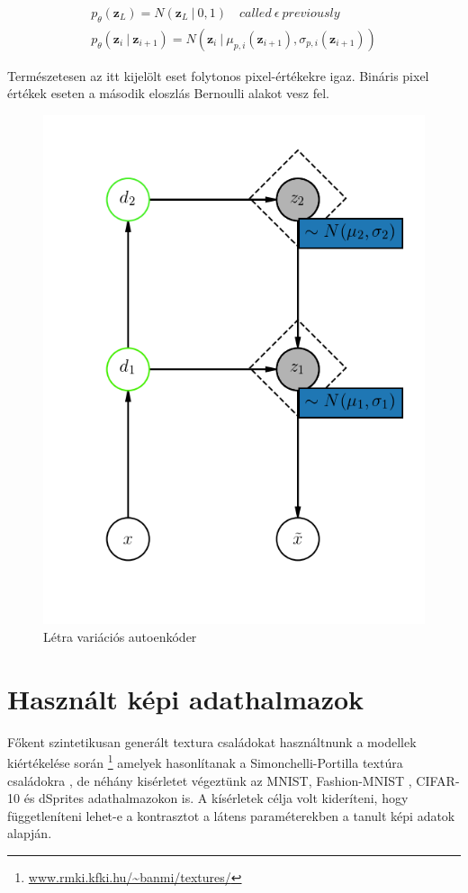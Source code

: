 \documentclass[12pt, english]{article}
\begin{document}
\vspace{4mm}

\begin{gather*}
    p_{\theta}(\bm{z}_L) = N(\bm{z}_L  ~ | ~ 0, 1) \quad called\ \epsilon\ previously\\
    p_{\theta}(\bm{z}_i ~ | ~ \bm{z}_{i+1}) = N(\bm{z}_i ~ |  ~ \mu_{p,i}(\bm{z}_{i+1}), \sigma_{p, i}(\bm{z}_{i+1}))
\end{gather*}

\vspace{4mm}

\par Természetesen az itt kijelölt eset folytonos pixel-értékekre igaz. Bináris pixel értékek eseten a második eloszlás Bernoulli alakot vesz fel.

\vspace{4mm}

\begin{figure}[H]
    \centering
    \includegraphics[width=0.35\linewidth]{lvae.png}
    \caption{Létra variációs autoenkóder}
\end{figure}

\newpage

\section{Használt képi adathalmazok}

\vspace{7mm}

\par Főkent szintetikusan generált textura családokat használtnunk a modellek kiértékelése során \footnote{\url{www.rmki.kfki.hu/~banmi/textures/}} amelyek hasonlítanak a  Simonchelli-Portilla textúra családokra \cite{portilla2003image}, de néhány kisérletet végeztünk az MNIST, Fashion-MNIST \cite{xiao2017fashion}, CIFAR-10 és dSprites adathalmazokon \cite{matthey2017dsprites} is. A kísérletek célja volt kideríteni, hogy függetleníteni lehet-e a kontrasztot a látens paraméterekben a tanult képi adatok alapján.
\end{document}

